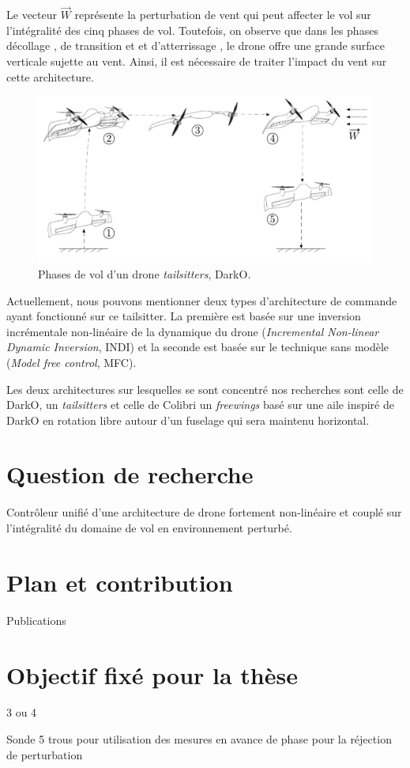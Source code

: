 Le vecteur $\overrightarrow{W}$ représente la perturbation de vent qui peut affecter le vol sur l'intégralité des cinq phases de vol. Toutefois, on observe que dans les phases décollage , de transition  et  et d'atterrissage , le drone offre une grande surface verticale sujette au vent. Ainsi, il est nécessaire de traiter l'impact du vent sur cette architecture.

\begin{figure}[ht!]
    \centering
        \includegraphics[width=0.8\columnwidth]{figures/darko_transition.png}
        \caption{Phases de vol d'un drone \textit{tailsitters}, DarkO.}
        \label{fig:darko_flight}
\end{figure}

Actuellement, nous pouvons mentionner deux types d'architecture de commande ayant fonctionné sur ce tailsitter. La première est basée sur une inversion incrémentale non-linéaire de la dynamique du drone (\textit{Incremental Non-linear Dynamic Inversion}, INDI)  et la seconde est basée sur le technique sans modèle (\textit{Model free control}, MFC). 

Les deux architectures sur lesquelles se sont concentré nos recherches sont celle de DarkO, un \textit{tailsitters} et celle de Colibri un \textit{freewings} basé sur une aile inspiré de DarkO en rotation libre autour d'un fuselage qui sera maintenu horizontal.





\section*{Question de recherche}
Contrôleur unifié d'une architecture de drone fortement non-linéaire et couplé sur l'intégralité du domaine de vol en environnement perturbé.

\section*{Plan et contribution}
Publications

\section*{Objectif fixé pour la thèse}
3 ou 4 

Sonde 5 trous pour utilisation des mesures en avance de phase pour la réjection de perturbation
